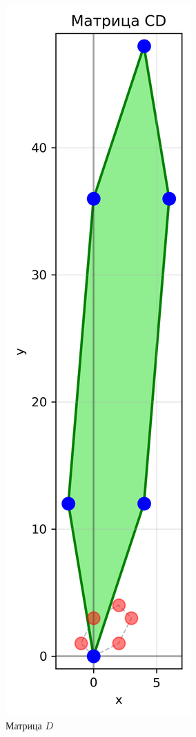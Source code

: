 \begin{figure}[h]
\begin{minipage}{0.23\textwidth}
\caption{Матрица $D$}
\label{fig:matrix_D}
\end{minipage}
\hfill
\begin{minipage}{0.23\textwidth}
\centering
\includegraphics[width=\textwidth]{images/task1/matrix_CD.png}

\end{minipage}
\end{figure}
